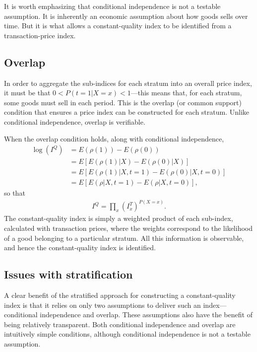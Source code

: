 \documentclass[
]{article}
\begin{document}
It is worth emphasizing that conditional independence is not a testable assumption. It is inherently an economic assumption about how goods sells over time. But it is what allows a constant-quality index to be identified from a transaction-price index.

\hypertarget{overlap}{%
\subsection{Overlap}\label{overlap}}

In order to aggregate the sub-indices for each stratum into an overall price index, it must be that \(0 < P(t = 1 | X = x) < 1\)---this means that, for each stratum, some goods must sell in each period. This is the overlap (or common support) condition that ensures a price index can be constructed for each stratum. Unlike conditional independence, overlap is verifiable.

When the overlap condition holds, along with conditional independence,
\begin{align*}
\log(I^{Q}) &= E(\rho(1)) - E(\rho(0)) \\
&= E[E(\rho(1) | X) - E(\rho(0) | X)] \\
&= E[E(\rho(1) | X, t = 1) - E(\rho(0) | X, t = 0)] \\
&= E[E(\rho | X, t = 1) - E(\rho | X, t = 0)],
\end{align*}
so that
\begin{align*}
I^{Q} = \prod_{x} (I^{T}_{x})^{P(X = x)}.
\end{align*}
The constant-quality index is simply a weighted product of each sub-index, calculated with transaction prices, where the weights correspond to the likelihood of a good belonging to a particular stratum. All this information is observable, and hence the constant-quality index is identified.

\hypertarget{issues-with-stratification}{%
\subsection{Issues with stratification}\label{issues-with-stratification}}

A clear benefit of the stratified approach for constructing a constant-quality index is that it relies on only two assumptions to deliver such an index---conditional independence and overlap. These assumptions also have the benefit of being relatively transparent. Both conditional independence and overlap are intuitively simple conditions, although conditional independence is not a testable assumption.
\end{document}
